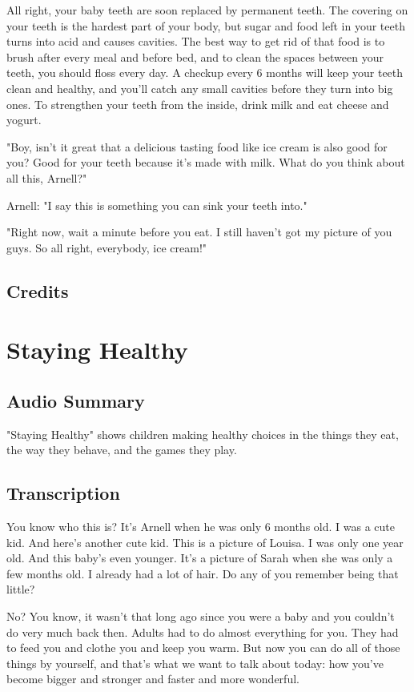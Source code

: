 All right, your baby teeth are soon replaced by permanent teeth. The covering on your teeth is the hardest part of your body, but sugar and food left in your teeth turns into acid and causes cavities. The best way to get rid of that food is to brush after every meal and before bed, and to clean the spaces between your teeth, you should floss every day. A checkup every 6 months will keep your teeth clean and healthy, and you'll catch any small cavities before they turn into big ones. To strengthen your teeth from the inside, drink milk and eat cheese and yogurt.

"Boy, isn't it great that a delicious tasting food like ice cream is also good for you? Good for your teeth because it's made with milk. What do you think about all this, Arnell?"

Arnell: "I say this is something you can sink your teeth into."

"Right now, wait a minute before you eat. I still haven't got my picture of you guys. So all right, everybody, ice cream!"

\subsection{Credits}

\section{Staying Healthy}

\subsection{Audio Summary}

"Staying Healthy" shows children making healthy choices in the things they eat, the way they behave, and the games they play.

\subsection{Transcription}

You know who this is? It's Arnell when he was only 6 months old. I was a cute kid. And here's another cute kid. This is a picture of Louisa. I was only one year old. And this baby's even younger. It's a picture of Sarah when she was only a few months old. I already had a lot of hair. Do any of you remember being that little?

No? You know, it wasn't that long ago since you were a baby and you couldn't do very much back then. Adults had to do almost everything for you. They had to feed you and clothe you and keep you warm. But now you can do all of those things by yourself, and that's what we want to talk about today: how you've become bigger and stronger and faster and more wonderful.

